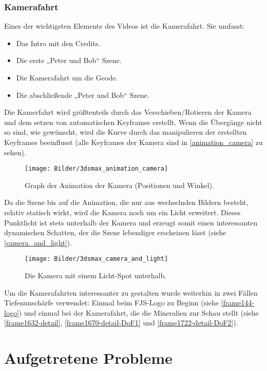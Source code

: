 \documentclass{scrreprt}
\begin{document}
\subsubsection{Kamerafahrt}

Eines der wichtigsten Elemente des Videos ist die Kamerafahrt. Sie umfasst:
\begin{itemize}
\item Das Intro mit den Credits.
\item Die erste „Peter und Bob“ Szene.
\item Die Kamerafahrt um die Geode.
\item Die abschließende „Peter und Bob“ Szene.
\end{itemize}

Die Kamerfahrt wird größtenteils durch das Verschieben/Rotieren der Kamera und dem setzen von automatischen Keyframes erstellt. Wenn die Übergänge nicht so sind, wie gewünscht, wird die Kurve durch das manipulieren der erstellten Keyframes beeinflusst (alle Keyframes der Kamera sind in \autoref{animation_camera} zu sehen).

\begin{figure}[!ht]
\centering
\texttt{[image: Bilder/3dsmax\_animation\_camera]}
\caption{Graph der Animation der Kamera (Positionen und Winkel).}
\label{animation_camera}
\end{figure}

Da die Szene bis auf die Animation, die nur aus wechselnden Bildern besteht, relativ statisch wirkt, wird die Kamera noch um ein Licht erweitert. Dieses Punktlicht ist stets unterhalb der Kamera und erzeugt somit einen interessanten dynamischen Schatten, der die Szene lebendiger erscheinen lässt (siehe \autoref{camera_and_light}).

\begin{figure}[!ht]
\centering
\texttt{[image: Bilder/3dsmax\_camera\_and\_light]}
\caption{Die Kamera mit einem Licht-Spot unterhalb.}
\label{camera_and_light}
\end{figure}

Um die Kamerafahrten interessanter zu gestalten wurde weiterhin in zwei Fällen Tiefenunschärfe verwendet: Einmal beim FJS-Logo zu Beginn (siehe \autoref{frame144-logo}) und einmal bei der Kamerafahrt, die die Mineralien zur Schau stellt (siehe \autoref{frame1632-detail}, \autoref{frame1670-detail-DoF1} und \autoref{frame1722-detail-DoF2}).

\section{Aufgetretene Probleme}
\end{document}
